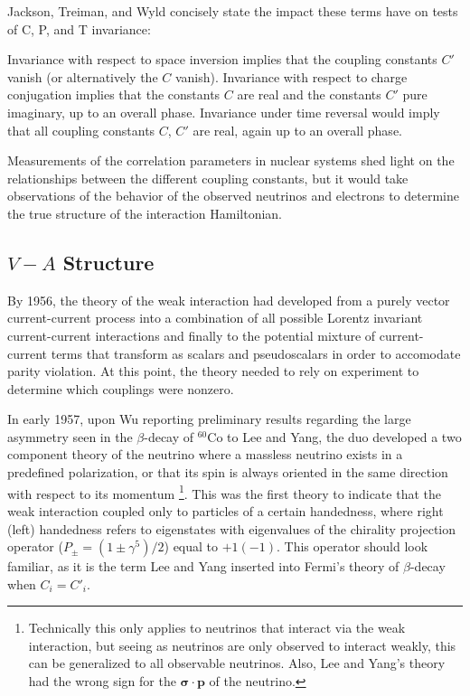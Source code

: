 Jackson, Treiman, and Wyld concisely state the impact these terms have on tests of C, P, and
T invariance:
\begin{displayquote}
Invariance with respect to space inversion implies that the coupling constants $C'$
vanish (or alternatively the $C$ vanish). Invariance with respect to charge
conjugation implies that the constants $C$ are real and the constants $C'$
pure imaginary, up to an overall phase. Invariance under time reversal
would imply that all coupling constants $C$, $C'$ are real, again up to an
overall phase.
\end{displayquote}

Measurements of the correlation parameters in nuclear systems shed light on the
relationships between the different coupling constants, but it would take observations
of the behavior of the observed neutrinos and electrons to determine the true structure
of the interaction Hamiltonian.

\subsection{$V-A$ Structure}

By 1956, the theory of the weak interaction had developed from a purely vector current-current
process into
a combination of all possible Lorentz invariant current-current interactions and finally to the potential mixture
of current-current terms that transform as scalars and pseudoscalars in order to accomodate
parity violation. At this point, the theory needed to rely on experiment to determine
which couplings were nonzero.

In early 1957, upon Wu reporting preliminary results regarding the large asymmetry seen in the $\beta$-decay
of $^{60}\mathrm{Co}$ to Lee and Yang, the duo developed a two component theory
of the neutrino where a massless neutrino exists in a predefined polarization, or that
its spin is always oriented in the same direction with respect to its momentum \cite{lee1957}
\footnote{Technically this only applies to neutrinos that interact via
  the weak interaction, but seeing as neutrinos are only
  observed to interact weakly, this can be generalized to all observable neutrinos. Also, Lee and
  Yang's theory had the wrong sign for the $\boldsymbol{\sigma \cdot p}$ of the neutrino.}.
This was the first theory to indicate that the weak interaction coupled only to particles
of a certain handedness, where right (left) handedness refers to eigenstates with eigenvalues of the
chirality projection operator ($P_{\pm} = (1\pm \gamma^5)/2$) equal to $+1\mathrm{ }(-1)$. This operator
should look familiar, as it is the term Lee and Yang inserted into Fermi's theory of $\beta$-decay
when $C_i=C'_i$. 

